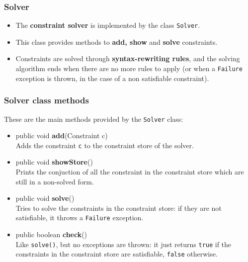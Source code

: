 \documentclass{beamer}
\begin{document}
\begin{frame}[fragile]
\frametitle{Solver}
\begin{itemize}
\setlength\itemsep{2em}
\item The \textbf{constraint solver} is implemented by the class \texttt{Solver}.\\
\item This class provides methods to \textbf{add, show} and \textbf{solve} constraints.\\
\item Constraints are solved through \textbf{syntax-rewriting rules}, and the solving algorithm ends when there are no more rules to apply (or when a \texttt{Failure} exception is thrown, in the case of a non satisfiable constraint).\\
\end{itemize}
\end{frame}

\begin{frame}[fragile]
\frametitle{Solver class methods}
These are the main methods provided by the \texttt{Solver} class:\\
\begin{itemize}
\item public void \textbf{add}(Constraint c)\\ 
Adds the constraint \texttt{c} to the constraint store of the solver.\\
\item public void \textbf{showStore}()\\ 
Prints the conjuction of all the constraint in the constraint store which are still in a non-solved form.\\
\item public void \textbf{solve}()\\ 
Tries to solve the constraints in the constraint store: if they are not satisfiable, it throws a \texttt{Failure} exception.\\
\item public boolean \textbf{check}()\\ 
Like \texttt{solve()}, but no exceptions are thrown: it just returns \texttt{true} if the constraints in the constraint store are satisfiable, \texttt{false} otherwise.\\
\end{itemize}

\end{frame}
\end{document}
